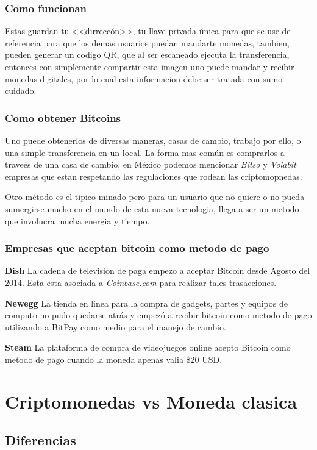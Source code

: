 \documentclass[12pt,letterpaper]{article}
\begin{document}
        \subsubsection*{Como funcionan}
            Estas guardan tu <<dirrecc\'on>>, tu llave privada \'unica para que se use de referencia para que los demas usuarios puedan mandarte monedas, tambien, pueden generar un codigo QR, que al ser escaneado ejecuta la transferencia, entonces con simplemente compartir esta imagen uno puede mandar y recibir monedas digitales, por lo cual esta informacion debe ser tratada con sumo cuidado.

            \subsubsection*{Como obtener Bitcoins}
	Uno puede obtenerlos de diversas maneras, casas de cambio, trabajo por ello, o una simple transferencia en un local. La forma mas com\'un es comprarlos a trave\'es de una casa de cambio, en M\'exico podemos mencionar \textit{Bitso} y \textit{Volabit} empresas que estan respetando las regulaciones que rodean las criptomopnedas.
	
	Otro m\'etodo es el tipico minado pero para un usuario que no quiere o no pueda sumergirse mucho en el mundo de esta nueva tecnologia, llega a ser un metodo que involucra mucha energia y tiempo.
            \subsubsection*{Empresas que aceptan bitcoin como metodo de pago}
\textbf{Dish}
La cadena de television de paga empezo a aceptar Bitcoin desde Agosto del 2014. Esta esta asociada a \textit{Coinbase.com} para realizar tales trasacciones.

\textbf{Newegg}
La tienda en linea para la compra de gadgets, partes y equipos de computo no pudo quedarse atr\'as y empez\'o a recibir bitcoin como metodo de pago utilizando a BitPay como medio para el manejo de cambio.

\textbf{Steam}
La plataforma de compra de videojuegos online acepto Bitcoin como metodo de pago cuando la moneda apenas valia \$20 USD.
\section*{Criptomonedas vs Moneda clasica}

	\subsection*{Diferencias}
\end{document}
